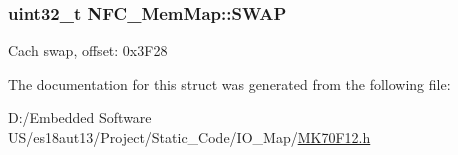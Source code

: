 \subsubsection[{S\+W\+A\+P}]{\setlength{\rightskip}{0pt plus 5cm}uint32\+\_\+t N\+F\+C\+\_\+\+Mem\+Map\+::\+S\+W\+A\+P}\label{struct_n_f_c___mem_map_acb4d1261ff3c34b54bc5c14496f742ac}
Cach swap, offset\+: 0x3\+F28 

The documentation for this struct was generated from the following file\+:\begin{DoxyCompactItemize}
\item 
D\+:/\+Embedded Software U\+S/es18aut13/\+Project/\+Static\+\_\+\+Code/\+I\+O\+\_\+\+Map/\hyperlink{_m_k70_f12_8h}{M\+K70\+F12.\+h}\end{DoxyCompactItemize}
